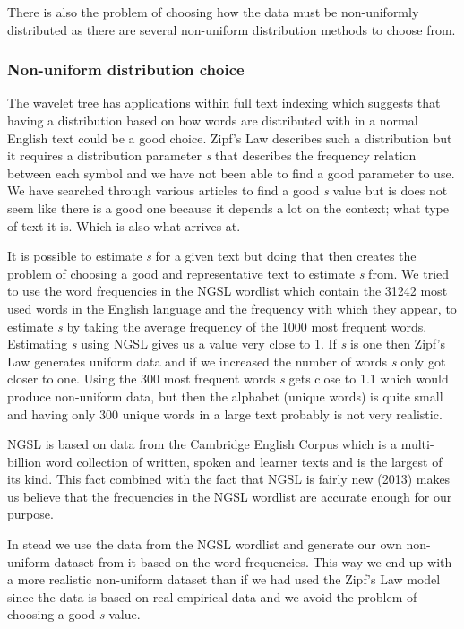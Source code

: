 There is also the problem of choosing how the data must be non-uniformly distributed as there are several non-uniform distribution methods to choose from.

\subsubsection{Non-uniform distribution choice}
The wavelet tree has applications within full text indexing which suggests that having a distribution based on how words are distributed with in a normal English text could be a good choice. 
Zipf's Law describes such a distribution \citep[abstract]{ZipfsLawOnText} but it requires a distribution parameter \textit{s} that describes the frequency relation between each symbol and we have not been able to find a good parameter to use. 
We have searched through various articles to find a good \textit{s} value but is does not seem like there is a good one because it depends a lot on the context; what type of text it is. 
Which is also what \citep[abstract]{ZipfsLawOnText} arrives at.

It is possible to estimate \textit{s} for a given text but doing that then creates the problem of choosing a good and representative text to estimate \textit{s} from.
We tried to use the word frequencies in the NGSL \citep{NGSL} wordlist which contain the 31242 most used words in the English language and the frequency with which they appear, to estimate \textit{s} by taking the average frequency of the 1000 most frequent words.
Estimating \textit{s} using NGSL gives us a value very close to 1. If \textit{s} is one then Zipf's Law generates uniform data and if we increased the number of words \textit{s} only got closer to one. 
Using the 300 most frequent words \textit{s} gets close to 1.1 which would produce non-uniform data, but then the alphabet (unique words) is quite small and having only 300 unique words in a large text probably is not very realistic. 

NGSL is based on data from the Cambridge English Corpus which is a multi-billion word collection of written, spoken and learner texts and is the largest of its kind.
This fact combined with the fact that NGSL is fairly new (2013) makes us believe that the frequencies in the NGSL wordlist are accurate enough for our purpose.

In stead we use the data from the NGSL \citep{NGSL} wordlist and generate our own non-uniform dataset from it based on the word frequencies.
This way we end up with a more realistic non-uniform dataset than if we had used the Zipf's Law model since the data is based on real empirical data and we avoid the problem of choosing a good \textit{s} value.


